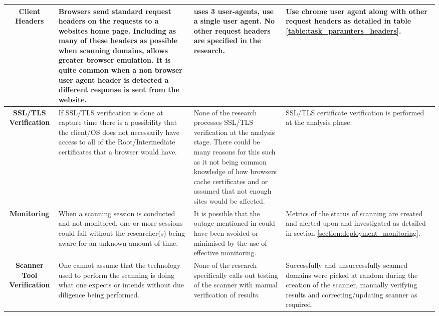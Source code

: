 \documentclass{mscreport}
\begin{document}
\begin{center}
\begin{longtable}{|C|E|H|H|}
      \hline
      \textbf{Client Headers} & Browsers send standard request headers on the requests to a websites home page. Including as many of these headers as possible when scanning domains, allows greater browser emulation. It is quite common when a non browser user agent header is detected a different response is sent from the website. & \cite{Patil2017-bg} uses 3 user-agents, \cite{Buchanan2018-xz,Amann2017-co,Kotzias2018-wd,Poteat2021-zr,Van_Goethem2014-ao,Chen2016-dl,Kumar2017-qw,Michael2015-hn} use a single user agent. No other request headers are specified in the research. & Use chrome user agent along with other request headers as detailed in table \ref{table:task_paramters_headers}. \\
      \hline
      \textbf{SSL/TLS Verification} & If SSL/TLS verification is done at capture time there is a possibility that the client/OS does not necessarily have access to all of the Root/Intermediate certificates that a browser would have. & None of the research \cite{Patil2017-bg,Buchanan2018-xz,Amann2017-co,Kotzias2018-wd,Poteat2021-zr,Roth2020-hg,Van_Goethem2014-ao,Chen2016-dl,Kumar2017-qw,Calzavara2018-xv,Holz2020-ha,Michael2015-hn} processes SSL/TLS verification at the analysis stage. There could be many reasons for this such as it not being common knowledge of how browsers cache certificates and or assumed that not enough sites would be affected. & SSL/TLS certificate verification is performed at the analysis phase. \\
      \hline
      \textbf{Monitoring} & When a scanning session is conducted and not monitored, one or more sessions could fail without the researcher(s) being aware for an unknown amount of time. & It is possible that the outage mentioned in \cite{Poteat2021-zr} could have been avoided or minimised by the use of effective monitoring. & Metrics of the status of scanning are created and alerted upon and investigated as detailed in section \ref{section:deployment_monitoring}. \\
      \hline
      \textbf{Scanner Tool Verification} & One cannot assume that the technology used to perform the scanning is doing what one expects or intends without due diligence being performed. & None of the research specifically calls out testing of the scanner with manual verification of results. & Successfully and unsuccessfully scanned domains were picked at random during the creation of the scanner, manually verifying results and correcting/updating scanner as required. \\

\end{longtable}
\end{center}
\end{document}
